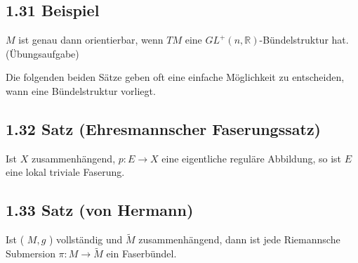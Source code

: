 \documentclass[10pt, letterpaper]{article}
\begin{document}
\subsection*{1.31 Beispiel}
$M$ ist genau dann orientierbar, wenn $T M$ eine $G L^{+}(n, \mathbb{R})$-Bündelstruktur hat. (Übungsaufgabe)

Die folgenden beiden Sätze geben oft eine einfache Möglichkeit zu entscheiden, wann eine Bündelstruktur vorliegt.

\subsection*{1.32 Satz (Ehresmannscher Faserungssatz)}
Ist $X$ zusammenhängend, $p: E \rightarrow X$ eine eigentliche reguläre Abbildung, so ist $E$ eine lokal triviale Faserung.

\subsection*{1.33 Satz (von Hermann)}
Ist ( $M, g$ ) vollständig und $\tilde{M}$ zusammenhängend, dann ist jede Riemannsche Submersion $\pi: M \rightarrow \tilde{M}$ ein Faserbündel.
\end{document}
